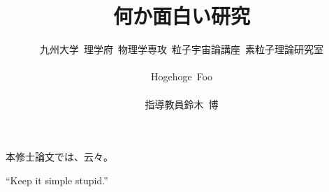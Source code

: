 \documentclass[dvipdfmx,a4j,11pt]{jsarticle}
\title{\vspace{-2ex}何か面白い研究}
\author{九州大学~理学府~物理学専攻~粒子宇宙論講座~素粒子理論研究室\\
\vspace{-1.5ex}\\
Hogehoge~Foo\\
\vspace{-1.5ex}\\
指導教員\hspace{1em}鈴木~博}
\date{}
\begin{document}
\maketitle


本修士論文では、云々。

``Keep it simple stupid.''
\end{document}
